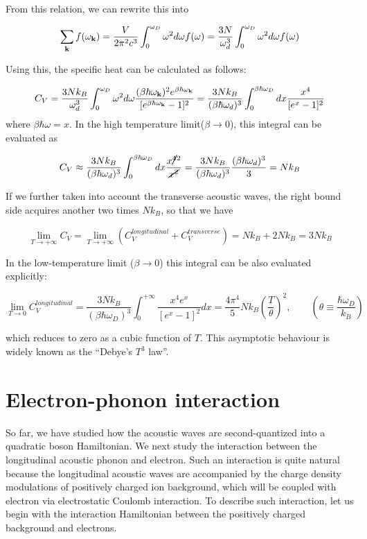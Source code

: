 From this relation, we can rewrite this into 

\[\sum_{\bf k}f(\omega_{\bf k}) = \frac{V}{2\pi^2c^3}\int_0^{\omega_D} \omega^2d\omega f(\omega) = \frac{3N}{\omega_d^3}\int_0^{\omega_D} \omega^2d\omega f(\omega) \]

Using this, the specific heat can be calculated as follows:

\[C_V = \frac{3Nk_B}{\omega_d^3}\int_0^{\omega_D} \omega^2d\omega \frac{({\beta\hbar\omega_{\bf k}})^2e^{\beta\hbar\omega_{\bf k}}}{[e^{\beta\hbar\omega_{\bf k}} - 1]^2} = \frac{3Nk_B}{(\beta\hbar\omega_d)^3}\int_0^{\beta\hbar\omega_D} dx \frac{x^4}{[e^x - 1]^2} \]
where $\beta\hbar\omega = x$. In the high temperature limit($\beta\to0$), this integral can be evaluated as 

\[C_V \approx\frac{3Nk_B}{(\beta\hbar\omega_d)^3}\int_0^{\beta\hbar\omega_D} dx \frac{x\cancel{^4}^2}{\cancel{x^2}} = \frac{3Nk_B}{(\beta\hbar\omega_d)^3}\frac{(\beta\hbar\omega_d)^3}{3} = Nk_B \]

If we further taken into account the transverse acoustic waves, the right bound side acquires another two times $Nk_B$, so that we have 

\[\lim_{T\to+\infty}C_V = \lim_{T\to+\infty}\left(C_V^{longitudinal}+C_V^{transverse}\right) = Nk_B+2Nk_B = 3Nk_B \]

In the low-temperature limit ($\beta\to0$) this integral can be also evaluated explicitly:

\[\lim_{T\to0}C_V^{longitudinal} = \frac{3Nk_B}{(\beta\hbar\omega_D)^3}\int_0^{+\infty}\frac{x^4e^x}{[e^x-1]^2}dx = \frac{4\pi^4}{5}Nk_B\left(\frac{T}{\theta}\right)^2,\quad\quad\left(\theta \equiv \frac{\hbar\omega_D}{k_B}\right) \]

which reduces to zero as a cubic function of $T$. This asymptotic behaviour is widely known as the ``Debye's $T^3$ law''. 


\section{Electron-phonon interaction} \label{se5-2}%

So far, we have studied how the acoustic waves are second-quantized into a quadratic boson Hamiltonian. We next study the interaction between the longitudinal acoustic phonon and electron. Such an interaction is quite natural because the longitudinal acoustic waves are accompanied by the charge density modulations of positively charged ion background, which will be coupled with electron via electrostatic Coulomb interaction. To describe such interaction, let us begin with the interaction Hamiltonian between the positively charged background and electrons. 

